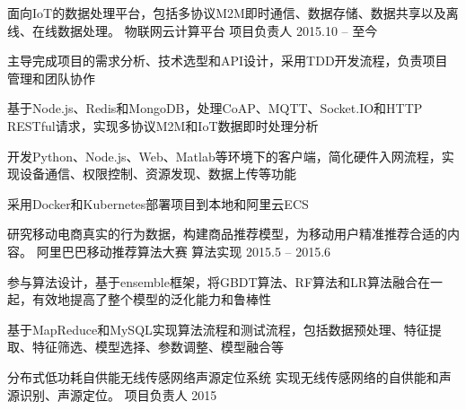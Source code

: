 


\begin{cventries}


\cventry
{面向IoT的数据处理平台，包括多协议M2M即时通信、数据存储、数据共享以及离线、在线数据处理。} %
{物联网云计算平台} %
{项目负责人} %
{2015.10 -- 至今} %
{ %
\begin{cvitems}
\item {主导完成项目的需求分析、技术选型和API设计，采用TDD开发流程，负责项目管理和团队协作}
\item {基于Node.js、Redis和MongoDB，处理CoAP、MQTT、Socket.IO和HTTP RESTful请求，实现多协议M2M和IoT数据即时处理分析}
\item {开发Python、Node.js、Web、Matlab等环境下的客户端，简化硬件入网流程，实现设备通信、权限控制、资源发现、数据上传等功能}
\item{采用Docker和Kubernetes部署项目到本地和阿里云ECS}
\end{cvitems}
}

\cventry
{研究移动电商真实的行为数据，构建商品推荐模型，为移动用户精准推荐合适的内容。} %
{阿里巴巴移动推荐算法大赛} %
{算法实现} %
{2015.5 -- 2015.6} %
{ %
\begin{cvitems}
\item {参与算法设计，基于ensemble框架，将GBDT算法、RF算法和LR算法融合在一起，有效地提高了整个模型的泛化能力和鲁棒性}
\item {基于MapReduce和MySQL实现算法流程和测试流程，包括数据预处理、特征提取、特征筛选、模型选择、参数调整、模型融合等}
\end{cvitems}
}

\begin{cvhonors}
\cvhonor
{分布式低功耗自供能无线传感网络声源定位系统} %
{实现无线传感网络的自供能和声源识别、声源定位。} %
{项目负责人} %
{2015} %


\end{cvhonors}
\end{cventries}
